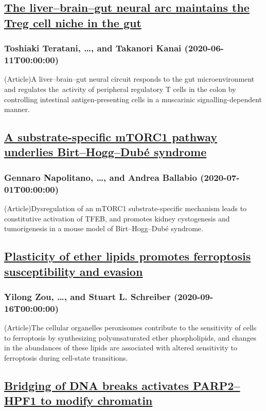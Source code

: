 \subsection*{\href{https://www.nature.com/articles/s41586-020-2425-3}{The liver–brain–gut neural arc maintains the Treg cell niche in the gut}}
\subsubsection*{Toshiaki Teratani, \dots, and Takanori Kanai (2020-06-11T00:00:00)}
(Article)A liver–brain–gut neural circuit responds to the gut microenvironment and regulates the activity of peripheral regulatory T cells in the colon by controlling intestinal antigen-presenting cells in a muscarinic signalling-dependent manner.
\subsection*{\href{https://www.nature.com/articles/s41586-020-2444-0}{A substrate-specific mTORC1 pathway underlies Birt–Hogg–Dubé syndrome}}
\subsubsection*{Gennaro Napolitano, \dots, and Andrea Ballabio (2020-07-01T00:00:00)}
(Article)Dysregulation of an mTORC1 substrate-specific mechanism leads to constitutive activation of TFEB, and promotes kidney cystogenesis and tumorigenesis in a mouse model of Birt–Hogg–Dubé syndrome.
\subsection*{\href{https://www.nature.com/articles/s41586-020-2732-8}{Plasticity of ether lipids promotes ferroptosis susceptibility and evasion}}
\subsubsection*{Yilong Zou, \dots, and Stuart L. Schreiber (2020-09-16T00:00:00)}
(Article)The cellular organelles peroxisomes contribute to the sensitivity of cells to ferroptosis by synthesizing polyunsaturated ether phospholipids, and changes in the abundances of these lipids are associated with altered sensitivity to ferroptosis during cell-state transitions.
\subsection*{\href{https://www.nature.com/articles/s41586-020-2725-7}{Bridging of DNA breaks activates PARP2–HPF1 to modify chromatin}}
